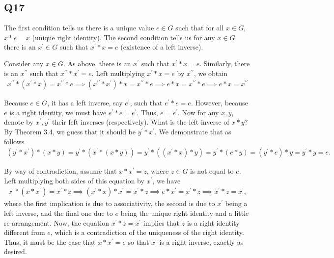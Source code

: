 \documentclass[12pt]{article}
\numberwithin{theorem}{section}
\numberwithin{equation}{section}
\numberwithin{remark}{section}
\numberwithin{definition}{section}
\numberwithin{theorem}{section}
\numberwithin{lemma}{section}
\numberwithin{example}{section}
\begin{document}
\subsection{Q17}

The first condition tells us there is a unique value $e\in G$ such that for all $x\in G$, $x*e=x$ (unique right identity). The second condition tells us for any $x\in G$ there is an $x^\prime\in G$ such that $x^\prime * x = e$ (existence of a left inverse). 

Consider any $x\in G$. As above, there is an $x^\prime$ such that $x^\prime * x = e$. Similarly, there is an $x^{\prime\prime}$ such that $x^{\prime\prime}*x^\prime=e$. Left multiplying $x^\prime * x = e$ by $x^{\prime\prime}$, we obtain
\begin{align*}
	x^{\prime\prime}*(x^\prime* x) = x^{\prime\prime} * e \implies (x^{\prime\prime}*x^\prime)* x = x^{\prime\prime} * e \implies e * x = x^{\prime\prime} * e \implies e * x = x^{\prime\prime}
\end{align*}


Because $e\in G$, it has a left inverse, say $e^\prime$, such that $e^\prime * e = e$. However, because $e$ is a right identity, we must have $e^\prime*e=e^\prime$. Thus, $e=e^\prime$. Now for any $x,y$, denote by $x^\prime,y^\prime$ their left inverses (respectively). What is the left inverse of $x*y$? By Theorem 3.4, we guess that it should be $y^\prime * x^\prime$. We demonstrate that as follows
\begin{align*}
	(y^\prime * x^\prime)*(x*y)=y^\prime * (x^\prime*(x*y))=y^\prime * ((x^\prime*x)*y)=y^\prime * (e*y)=(y^\prime * e)*y=y^\prime*y=e.
\end{align*}

By way of contradiction, assume that $x*x^\prime = z$, where $z\in G$ is not equal to $e$. Left multiplying both sides of this equation by $x^\prime$, we have
\begin{align*}
	x^\prime*(x*x^\prime) = x^\prime*z \implies (x^\prime*x)*x^\prime = x^\prime*z \implies e*x^\prime = x^\prime* z \implies x^\prime * z = x^\prime,
\end{align*}
where the first implication is due to associativity, the second is due to $x^\prime$ being a left inverse, and the final one due to $e$ being the unique right identity and a little re-arrangement. Now, the equation $x^\prime * z = x^\prime$ implies that $z$ is a right identity different from $e$, which is a contradiction of the uniqueness of the right identity. Thus, it must be the case that $x*x^\prime = e$ so that $x^\prime$ is a right inverse, exactly as desired. 
\end{document}
